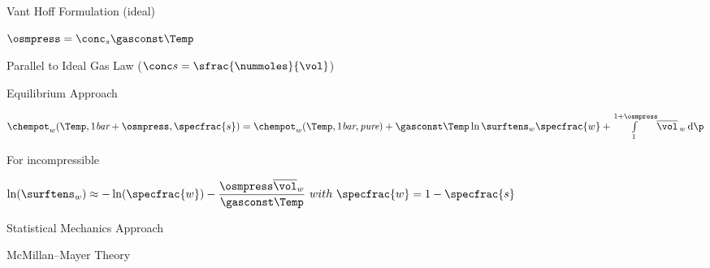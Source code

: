 \begin{bigmdframed}


\begin{listone}

	\item Vant Hoff Formulation (ideal)
	
    \begin{listtwo} 
		
        \item $\osmpress = \conc_{s}\gasconst\Temp $
	    	\item Parallel to Ideal Gas Law ($\conc s  = \sfrac{\nummoles}{\vol}$)
	
    \end{listtwo}
	
    \item Equilibrium Approach
	
    \begin{listtwo}
    
		\item $\chempot_{w}(\Temp,1\textit{bar}+\osmpress,\specfrac{s}) = \chempot_{w}(\Temp,1\textit{bar},\textit{pure})+\gasconst\Temp\ln\surftens_{w}\specfrac{w}+\int\limits_{1}^{1+\osmpress}\!\overline{\vol}\,_{w}\, \mathrm{d}\p$
		
        \begin{listthree}
        
			\item For incompressible
            
			\begin{listfour}
					\item $\ln(\surftens_{w}) \approx -\ln(\specfrac{w})-\dfrac{\osmpress\overline{\vol}_{w}}{\gasconst\Temp}~with~\specfrac{w} = 1 - \specfrac{s}$
    			
            \end{listfour}
            
		\end{listthree}
        
	\end{listtwo}
    
	\item Statistical Mechanics Approach
    
	\begin{listtwo}
    
		\item McMillan--Mayer Theory
        
		\begin{listthree}
        

\end{listthree}
\end{listtwo}
\end{listone}
\end{bigmdframed}
